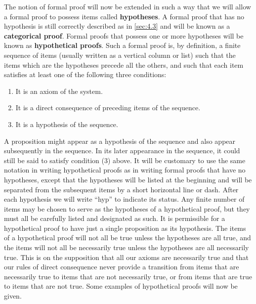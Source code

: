 \documentclass{book}
\begin{document}
The notion of formal proof will now be extended in such a way that we will allow a formal proof to possess items called \textbf{hypotheses}.  A formal proof that has no hypothesis is still correctly described as in \ref{sec:4.3} and will be known as a \textbf{categorical proof}.  Formal proofs that possess one or more hypotheses will be known as \textbf{hypothetical proofs}.  Such a formal proof is, by definition, a finite sequence of items (usually written as a vertical column or list) such that the items which are the hypotheses precede all the others, and such that each item satisfies at least one of the following three conditions:
\begin{enumerate}[resume*,start=1]
\item It is an axiom of the system.
\item It is a direct consequence of preceding items of the sequence.
\item It is a hypothesis of the sequence.
\end{enumerate}
A proposition might appear as a hypothesis of the sequence and also appear subsequently in the sequence.  In its later appearance in the sequence, it could still be said to satisfy condition (3) above.  It will be customary to use the same notation in writing hypothetical proofs as in writing formal proofs that have no hypotheses, except that the hypotheses will be listed at the beginning and will be separated from the subsequent items by a short horizontal line or dash.  After each hypothesis we will write “hyp” to indicate its status.  Any finite number of items may be chosen to serve as the hypotheses of a hypothetical proof, but they must all be carefully listed and designated as such.  It is permissible for a hypothetical proof to have just a single proposition as its hypothesis.  The items of a hypothetical proof will not all be true unless the hypotheses are all true, and the items will not all be necessarily true unless the hypotheses are all necessarily true.  This is on the supposition that all our axioms are necessarily true and that our rules of direct consequence never provide a transition from items that are necessarily true to items that are not necessarily true, or from items that are true to items that are not true.  Some examples of hypothetical proofs will now be given.

\medskip
\subsection{}
\label{sec:4.9}
\end{document}
